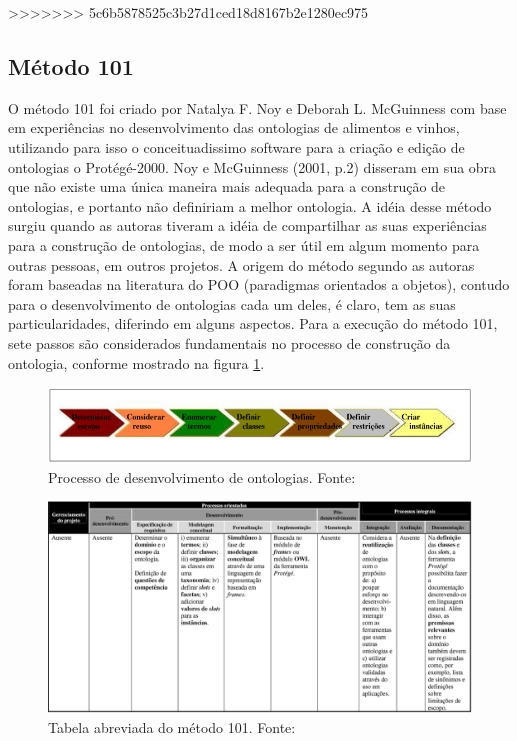 >>>>>>> 5c6b5878525c3b27d1ced18d8167b2e1280ec975
\subsection{Método 101} 
 O método 101 foi criado por  Natalya F. Noy e Deborah L. McGuinness com base em experiências no desenvolvimento
 das ontologias de alimentos e vinhos, utilizando para isso o conceituadissimo software para a criação e edição de
 ontologias o Protégé-2000. Noy e McGuinness (2001, p.2) disseram em sua obra que não existe uma única maneira mais
 adequada para a construção de ontologias, e portanto não definiriam a melhor ontologia. A idéia desse método surgiu
 quando as autoras tiveram a idéia de compartilhar  as suas experiências para a construção de ontologias, de modo a
 ser útil em algum momento para outras pessoas, em outros projetos. A origem do método segundo as autoras foram baseadas
 na literatura do POO (paradigmas orientados a objetos), contudo para o desenvolvimento de ontologias cada um deles, é
 claro, tem as suas particularidades, diferindo em alguns aspectos. \cite{VariosAutores2009} Para a execução do método 101,
 sete passos são considerados fundamentais no processo de construção da ontologia, conforme mostrado na figura \ref{fig:processo_101}.

\begin{figure}[h] 
\centering 
\includegraphics[scale=0.6]{Figuras/11.png} 
\caption[Processo de desenvolvimento de ontologias.]{Processo de desenvolvimento de ontologias. Fonte: \cite{DanielaLucas2008}}
\label{fig:processo_101}
\end{figure}

\begin{figure}[h] 
\centering 
\includegraphics[scale=0.4]{Figuras/12.png} 
\caption[Tabela abreviada do método 101]{Tabela abreviada do método 101. Fonte: \cite{DanielaLucas2008}}
\end{figure}

